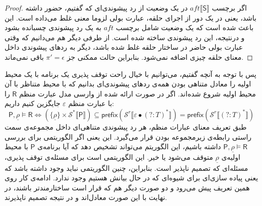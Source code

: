 \begin{proof}
اگر برچسب
$aft \llbracket \mathsf{S} \rrbracket$
در یک وضعیت از رد پیشوندی‌ای که گفتیم، حضور داشته باشد، یعنی در یک دور از اجرای حلقه، عبارت بولی لزوما معنی غلط می‌داده است. این باعث شده است که یک وضعیت شامل برچسب $aft$ به یک رد پیشوندی چسبانده بشود و درنتیجه، این رد پیشوندی ساخته شده است. از طرفی دیگر هم می‌دانیم که وقتی عبارت بولی حاضر در ساختار حلقه غلط شده باشد، دیگر به ردهای پیشوندی داخل معنای حلقه چیزی اضافه نمی‌شود. بنابراین حالت ممکنی جز $\pi'=\epsilon$ باقی نمی‌ماند. 
\end{proof}

پس با توجه به آنچه گفتیم، می‌توانیم با خیال راحت توقف پذیری یک برنامه با یک محیط اولیه را معادل متناهی بودن همه‌ی ردهای پیشوندی‌ای بدانیم که با محیط متناظر با آن محیط اولیه شروع شده‌اند.
اگر در صورت ارائه شده از وارسی مدل عبارت منظم $\mathsf{R}$ را با عبارت منظم $\varepsilon$ جایگزین کنیم داریم:
$$\mathsf{P},\underline{\rho} \models \mathsf{R}
\Leftrightarrow
(\{\underline{\rho}\}\times \mathcal{S}^* \llbracket \mathsf{P}\rrbracket) \subseteq 
\mathsf{prefix} (\mathcal{S}^r \llbracket \varepsilon \bullet (?:\mathit{T})^*\rrbracket)
=\mathsf{prefix} (\mathcal{S}^r \llbracket (?:\mathit{T})^*\rrbracket)$$
طبق تعریف معنای عبارات منظم، هر رد پیشوندی متناهی‌ای داخل مجموعه‌ی سمت راستی رابطه‌ی زیرمجموعه بودن قرار می‌گیرد. این یعنی اگر الگوریتمی برای بررسی 
$\mathsf{P} , \underline{\rho} \models \mathsf{R} $
داشته باشیم، این الگوریتم می‌تواند تشخیص دهد که آیا برنامه‌ی $\mathsf{P}$ با محیط اولیه‌ی $\underline{\rho}$ متوقف می‌شود یا خیر. این الگوریتمی است برای مسئله‌ی توقف پذیری، مسئله‌ای که تصمیم ناپذیر است. بنابراین، چنین الگوریتمی نباید وجود داشته باشد که یعنی پیاده سازی‌ای برای شیوه‌ای که در حال بیانش هستیم وجود ندارد. ادامه‌ی کار روی همین تعریف پیش می‌رود و دو صورت دیگر هم که قرار است ساختارمندتر باشند، در نهایت با این صورت معادل‌اند و در نتیجه تصمیم ناپذیرند.














